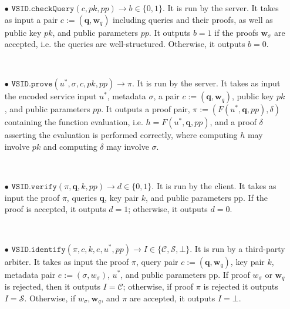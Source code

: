\begin{definition}
\begin{itemize}
\

\item[$\bullet$] $\mathtt{VSID.checkQuery}(c, pk,{pp})\rightarrow b\in\{0,1\}$. It is run by the server. It takes as input a pair $c:=(\bm{q}, \bm{w}_{\scriptscriptstyle q})$ including queries and their proofs, as well as public key $pk$, and {public parameters $pp$}. It outputs $b = 1$ if the proofs $\bm{w}_{\scriptscriptstyle\sigma}$ are accepted, i.e. the queries are well-structured. Otherwise, it outputs $b = 0$.

\

\item[$\bullet$] $\mathtt{VSID.prove}(u^{\scriptscriptstyle *},\sigma,c,pk, { pp})\rightarrow \pi$. It is run by the server. It takes as input the  encoded service input $u^{\scriptscriptstyle *}$, metadata $\sigma$, a pair $c:=(\bm{q},\bm{w}_{\scriptscriptstyle q})$,  public key $pk$, and { public parameters $pp$}. It outputs a proof pair, $\pi:=(F(u^{\scriptscriptstyle *},\bm{q},{ pp}),\delta)$ containing the function evaluation, i.e. $h=F(u^{\scriptscriptstyle *},\bm{q},{ pp})$, and a proof $\delta$ asserting the evaluation is performed correctly, where computing $h$ may involve $pk$ and computing $\delta$ may involve $\sigma$.



\

\item[$\bullet$] $\mathtt{VSID.verify}(\pi, \bm{q}, k, { pp})\rightarrow d\in\{0,1\}$. It is run by the client. It takes as input the proof $\pi$, queries $\bm{q}$,  key pair $k$, and  { public parameters pp}. If the proof is accepted, it outputs $d=1$; otherwise, it outputs $d=0$. 

\

\item[$\bullet$]  $\mathtt{VSID.identify}(\pi,c,k,e,u^{\scriptscriptstyle *}, { pp})\rightarrow I\in \{ \mathcal{C},\mathcal{S},\bot\}$. It is run by a third-party arbiter. It takes as input the proof $\pi$, query pair $c:=(\bm{q},\bm{w}_{\scriptscriptstyle q})$,  key pair $k$, metadata pair  $e:=(\sigma,w_{\sigma})$,  $u^{\scriptscriptstyle *}$, and { public parameters pp}. If   proof $w_{\scriptscriptstyle\sigma}$ or $\bm{w}_{\scriptscriptstyle q}$  is rejected, then it outputs $I=\mathcal C$; otherwise, if proof $\pi$ is rejected it outputs $I=\mathcal S$.  Otherwise, if  $w_{\scriptscriptstyle\sigma}, \bm{w}_{\scriptscriptstyle q}$, and $\pi$ are accepted, it outputs   $I=\bot$. 



\end{itemize}
\end{definition}


